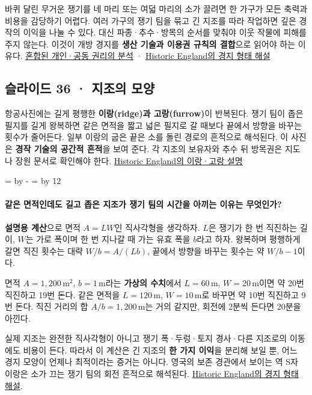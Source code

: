 \documentclass[10pt,a4paper]{article}
\newcommand{\ReserveQuestionSpace}{%
  \par\begingroup
  \dimen0=\pagegoal \advance\dimen0 by -\pagetotal
  \dimen2=\baselineskip \multiply\dimen2 by 12
  \ifdim\dimen0<\dimen2 \newpage\fi
  \endgroup}
\begin{document}
바퀴 달린 무거운 쟁기를 네 마리 또는 여덟 마리의 소가 끌려면 한 가구가 모든 축력과 비용을 감당하기 어렵다. 여러 가구의 쟁기 팀을 묶고 긴 지조를 따라 작업하면 깊은 경작의 이익을 나눌 수 있다. 대신 파종·추수·방목의 순서를 맞춰야 이웃 작물에 피해를 주지 않는다. 이것이 개방 경지를 \textbf{생산 기술과 이용권 규칙의 결합}으로 읽어야 하는 이유다. \href{https://doi.org/10.1086/468066}{혼합된 개인·공동 권리의 분석} · \href{https://historicengland.org.uk/images-books/publications/iha-field-systems/heag204-field-systems/}{Historic England의 경지 형태 해설}\par

\subsection{슬라이드 36 · 지조의 모양}
항공사진에는 길게 평행한 \textbf{이랑(ridge)과 고랑(furrow)}이 반복된다. 쟁기 팀이 좁은 필지를 길게 왕복하면 같은 면적을 짧고 넓은 필지로 갈 때보다 끝에서 방향을 바꾸는 횟수가 줄어든다. 일부 이랑의 굽은 끝은 소를 돌린 경로의 흔적으로 해석된다. 이 사진은 \textbf{경작 기술의 공간적 흔적}을 보여 준다. 각 지조의 보유자와 추수 뒤 방목권은 지도나 장원 문서로 확인해야 한다. \href{https://historicengland.org.uk/images-books/publications/iha-field-systems/heag204-field-systems/}{Historic England의 이랑·고랑 설명}\par

\ReserveQuestionSpace
\paragraph{같은 면적인데도 길고 좁은 지조가 쟁기 팀의 시간을 아끼는 이유는 무엇인가?}
\textbf{설명용 계산}으로 면적 $A=LW$인 직사각형을 생각하자. $L$은 쟁기가 한 번 직진하는 길이, $W$는 가로 폭이며 한 번 지나갈 때 가는 유효 폭을 $b$라고 하자. 왕복하며 평행하게 갈면 직진 횟수는 대략 $W/b=A/(Lb)$, 끝에서 방향을 바꾸는 횟수는 약 $W/b-1$이다.\par

면적 $A=1{,}200\,\mathrm{m}^2$, $b=1\,\mathrm{m}$라는 \textbf{가상의 수치}에서 $L=60\,\mathrm{m}$, $W=20\,\mathrm{m}$이면 약 20번 직진하고 19번 돈다. 같은 면적을 $L=120\,\mathrm{m}$, $W=10\,\mathrm{m}$로 바꾸면 약 10번 직진하고 9번 돈다. 직진 거리의 합 $A/b=1{,}200\,\mathrm{m}$는 거의 같지만, 회전에 2분씩 든다면 20분을 아낀다.\par

실제 지조는 완전한 직사각형이 아니고 쟁기 폭·두렁·토지 경사·다른 지조로의 이동에도 비용이 든다. 따라서 이 계산은 긴 지조의 \textbf{한 가지 이익}을 분리해 보일 뿐, 어느 경지 모양이 언제나 최적이라는 증거는 아니다. 영국의 보존 경관에서 보이는 역 S자 이랑은 소가 끄는 쟁기 팀의 회전 흔적으로 해석된다. \href{https://historicengland.org.uk/images-books/publications/iha-field-systems/heag204-field-systems/}{Historic England의 경지 형태 해설}.\par
\end{document}
